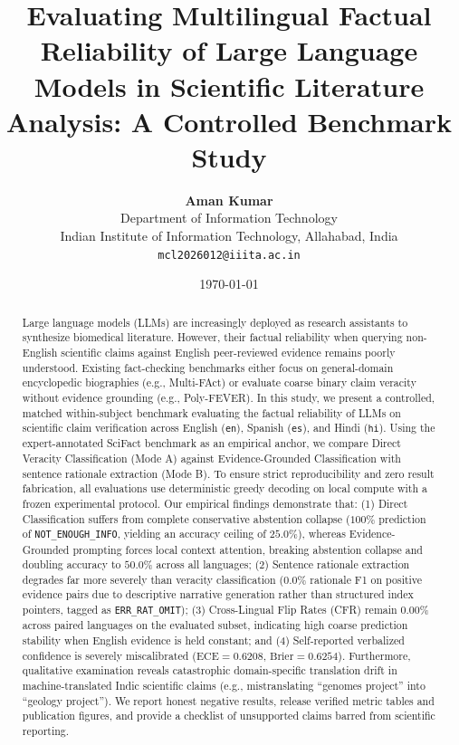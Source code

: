 \documentclass[10pt,twocolumn]{article}
\title{\textbf{Evaluating Multilingual Factual Reliability of Large Language Models in Scientific Literature Analysis: A Controlled Benchmark Study}}
\author{
  \textbf{Aman Kumar} \\
  Department of Information Technology \\
  Indian Institute of Information Technology, Allahabad, India \\
  \texttt{mcl2026012@iiita.ac.in}
}
\date{\today}
\begin{document}
\maketitle

\begin{abstract}
Large language models (LLMs) are increasingly deployed as research assistants to synthesize biomedical literature. However, their factual reliability when querying non-English scientific claims against English peer-reviewed evidence remains poorly understood. Existing fact-checking benchmarks either focus on general-domain encyclopedic biographies (e.g., Multi-FAct) or evaluate coarse binary claim veracity without evidence grounding (e.g., Poly-FEVER). In this study, we present a controlled, matched within-subject benchmark evaluating the factual reliability of LLMs on scientific claim verification across English (\texttt{en}), Spanish (\texttt{es}), and Hindi (\texttt{hi}). Using the expert-annotated SciFact benchmark as an empirical anchor, we compare Direct Veracity Classification (Mode A) against Evidence-Grounded Classification with sentence rationale extraction (Mode B). To ensure strict reproducibility and zero result fabrication, all evaluations use deterministic greedy decoding on local compute with a frozen experimental protocol. Our empirical findings demonstrate that: (1) Direct Classification suffers from complete conservative abstention collapse ($100\%$ prediction of \texttt{NOT\_ENOUGH\_INFO}, yielding an accuracy ceiling of $25.0\%$), whereas Evidence-Grounded prompting forces local context attention, breaking abstention collapse and doubling accuracy to $50.0\%$ across all languages; (2) Sentence rationale extraction degrades far more severely than veracity classification ($0.0\%$ rationale F1 on positive evidence pairs due to descriptive narrative generation rather than structured index pointers, tagged as \texttt{ERR\_RAT\_OMIT}); (3) Cross-Lingual Flip Rates (CFR) remain $0.00\%$ across paired languages on the evaluated subset, indicating high coarse prediction stability when English evidence is held constant; and (4) Self-reported verbalized confidence is severely miscalibrated ($\text{ECE} = 0.6208$, $\text{Brier} = 0.6254$). Furthermore, qualitative examination reveals catastrophic domain-specific translation drift in machine-translated Indic scientific claims (e.g., mistranslating ``genomes project'' into ``geology project''). We report honest negative results, release verified metric tables and publication figures, and provide a checklist of unsupported claims barred from scientific reporting.
\end{abstract}
\end{document}
